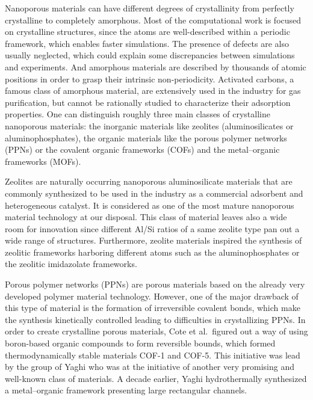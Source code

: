 \documentclass[main.tex]{subfiles}
\begin{document}
Nanoporous materials can have different degrees of crystallinity from perfectly crystalline to completely amorphous. Most of the computational work is focused on crystalline structures, since the atoms are well-described within a periodic framework, which enables faster simulations. The presence of defects are also usually neglected, which could explain some discrepancies between simulations and experiments. And amorphous materials are described by thousands of atomic positions in order to grasp their intrinsic non-periodicity.\cite{Thyagarajan_2020} Activated carbons, a famous class of amorphous material, are extensively used in the industry for gas purification, but cannot be rationally studied to characterize their adsorption properties. One can distinguish roughly three main classes of crystalline nanoporous materials: the inorganic materials like zeolites (aluminosilicates or aluminophosphates), the organic materials like the porous polymer networks (PPNs) or the covalent organic frameworks (COFs) and the metal--organic frameworks (MOFs).

Zeolites are naturally occurring nanoporous aluminosilicate materials that are commonly synthesized to be used in the industry as a commercial adsorbent and heterogeneous catalyst.\cite{Ozin_1989,Ma_2000} It is considered as one of the most mature nanoporous material technology at our disposal. This class of material leaves also a wide room for innovation since different Al/Si ratios of a same zeolite type pan out a wide range of structures. Furthermore, zeolite materials inspired the synthesis of zeolitic frameworks harboring different atoms such as the aluminophosphates or the zeolitic imidazolate frameworks.\cite{Wang_2012,Chen_2014_zeo} 

Porous polymer networks (PPNs) are porous materials based on the already very developed polymer material technology.\cite{Lu_2010,Wang_2020,Che_2020} However, one of the major drawback of this type of material is the formation of irreversible covalent bonds, which make the synthesis kinetically controlled leading to difficulties in crystallizing PPNs.\cite{Feng_2012} In order to create crystalline porous materials, Cote et al.\ figured out a way of using boron-based organic compounds to form reversible bounds, which formed thermodynamically stable materials COF-1 and COF-5.\cite{Cote_2005} This initiative was lead by the group of Yaghi who was at the initiative of another very promising and well-known class of materials. A decade earlier, Yaghi hydrothermally synthesized a metal--organic framework presenting large rectangular channels.\cite{Yaghi_1995} 
\end{document}
